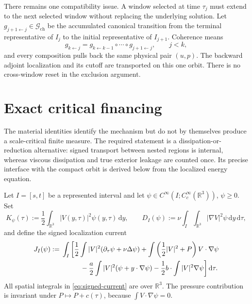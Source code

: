 \documentclass[11pt]{amsart}
\numberwithin{equation}{section}
\theoremstyle{plain}
\theoremstyle{definition}
\theoremstyle{remark}
\newcommand{\R}{\mathbb R}
\newcommand{\dd}{\,\mathrm d}
\begin{document}
There remains one compatibility issue.  A window selected at time
\(\tau_j\) must extend to the next selected window without replacing the
underlying solution.  Let
\(g_{j+1\leftarrow j}\in\mathcal G_{\mathrm{ch}}\) be the accumulated canonical
transition from the terminal representative of \(I_j\) to the initial
representative of \(I_{j+1}\).  Coherence means
\begin{equation}\label{eq:chart-transition-composition}
 g_{k\leftarrow j}
 =g_{k\leftarrow k-1}\circ\cdots\circ g_{j+1\leftarrow j},
 \qquad j<k,
\end{equation}
and every composition pulls back the same physical pair \((u,p)\).  The
backward adjoint localization and its cutoff are transported on this one
orbit.  There is no cross-window reset in the exclusion argument.

\section{Exact critical financing}
\label{sec:dissipation-reduction}

The material identities identify the mechanism but do not by themselves
produce a scale-critical finite measure.  The required statement is a
dissipation-or-reduction alternative: signed transport between nested regions is internal, whereas
viscous dissipation and true exterior leakage are counted once.  Its precise
interface with the compact orbit is derived below from the localized energy
equation.

Let \(I=[s,t]\) be a represented interval and let
\(\psi\in C^\infty(I;C_c^\infty(\R^3))\), \(\psi\ge0\).  Set
\begin{equation}\label{eq:signed-local-energy}
 K_\psi(\tau):=\frac12\int_{\R^3}|V(y,\tau)|^2\psi(y,\tau)\dd y,
 \qquad
 D_I(\psi):=\nu\int_I\int_{\R^3}|\nabla V|^2\psi\dd y\dd\tau,
\end{equation}
and define the signed localization current
\begin{align}
 J_I(\psi):={}&\int_I\bigg[
 \frac12\int |V|^2(\partial_\tau\psi+\nu\Delta\psi)
 +\int\left(\frac12|V|^2+P\right)V\cdot\nabla\psi \notag\\
 &\hspace{2.8em}
 -\frac a2\int|V|^2(\psi+y\cdot\nabla\psi)
 -\frac12 b\cdot\int|V|^2\nabla\psi
 \bigg]\dd\tau .
 \label{eq:signed-current}
\end{align}
All spatial integrals in \eqref{eq:signed-current} are over \(\R^3\).  The
pressure contribution is invariant under \(P\mapsto P+c(\tau)\), because
\(\int V\cdot\nabla\psi=0\).
\end{document}
